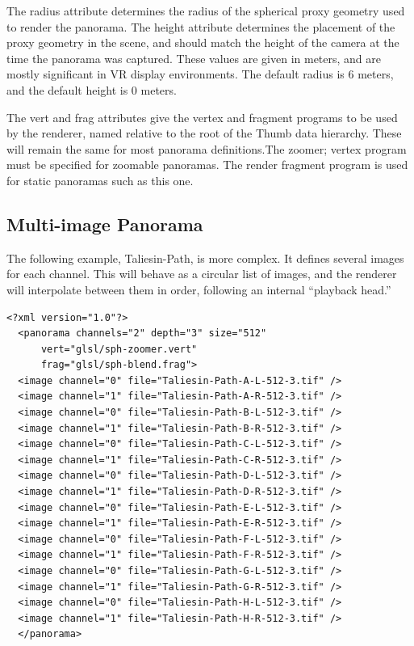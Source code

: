 \documentclass[oneside,11pt]{memoir}
\begin{document}
\begin{Spacing}{1.1}
The radius attribute determines the radius of the spherical proxy geometry used to render the panorama. The height attribute determines the placement of the proxy geometry in the scene, and should match the height of the camera at the time the panorama was captured. These values are given in meters, and are mostly significant in VR display environments. The default radius is 6 meters, and the default height is 0 meters.

The vert and frag attributes give the vertex and fragment programs to be used by the renderer, named relative to the root of the Thumb data hierarchy. These will remain the same for most panorama definitions.The zoomer; vertex program must be specified for zoomable panoramas. The render fragment program is used for static panoramas such as this one.

\subsection{Multi-image Panorama}

The following example, Taliesin-Path, is more complex. It defines several images for each channel. This will behave as a circular list of images, and the renderer will interpolate between them in order, following an internal “playback head.”

\begin{verbatim}
<?xml version="1.0"?>
  <panorama channels="2" depth="3" size="512"
      vert="glsl/sph-zoomer.vert"
      frag="glsl/sph-blend.frag">
  <image channel="0" file="Taliesin-Path-A-L-512-3.tif" />
  <image channel="1" file="Taliesin-Path-A-R-512-3.tif" />
  <image channel="0" file="Taliesin-Path-B-L-512-3.tif" />
  <image channel="1" file="Taliesin-Path-B-R-512-3.tif" />
  <image channel="0" file="Taliesin-Path-C-L-512-3.tif" />
  <image channel="1" file="Taliesin-Path-C-R-512-3.tif" />
  <image channel="0" file="Taliesin-Path-D-L-512-3.tif" />
  <image channel="1" file="Taliesin-Path-D-R-512-3.tif" />
  <image channel="0" file="Taliesin-Path-E-L-512-3.tif" />
  <image channel="1" file="Taliesin-Path-E-R-512-3.tif" />
  <image channel="0" file="Taliesin-Path-F-L-512-3.tif" />
  <image channel="1" file="Taliesin-Path-F-R-512-3.tif" />
  <image channel="0" file="Taliesin-Path-G-L-512-3.tif" />
  <image channel="1" file="Taliesin-Path-G-R-512-3.tif" />
  <image channel="0" file="Taliesin-Path-H-L-512-3.tif" />
  <image channel="1" file="Taliesin-Path-H-R-512-3.tif" />
  </panorama>
\end{verbatim}


\end{Spacing}
\end{document}
